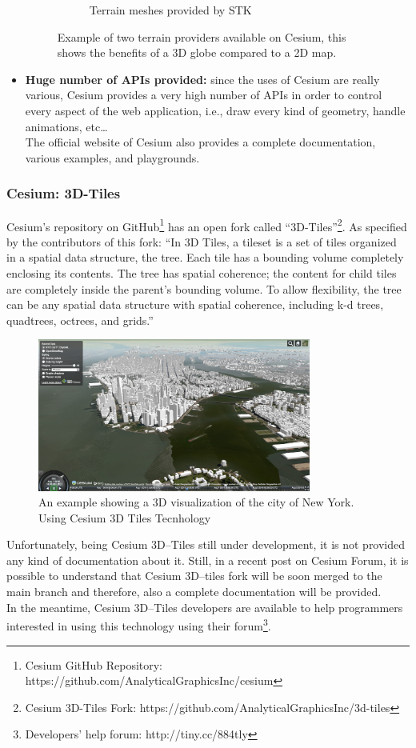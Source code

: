 \begin{itemize}
\begin{figure} [H]
\begin{subfigure}[b]{0.3\textwidth}
			\caption{Terrain meshes provided by STK}
			\label{fig:3D-Map}
		\end{subfigure}
		\caption{Example of two terrain providers available on Cesium, this shows the benefits of a 3D globe compared to a 2D map.}
	\end{figure}
	\item {\bf Huge number of APIs provided:} since the uses of Cesium are really various, Cesium provides a very high number of APIs in order to control every aspect of the web application, i.e., draw every kind of geometry, handle animations, etc\dots\\The official website of Cesium also provides a complete documentation, various examples, and playgrounds.
\end{itemize} 
\subsubsection{Cesium: 3D-Tiles}
Cesium's repository on GitHub\footnote{Cesium GitHub Repository: https://github.com/AnalyticalGraphicsInc/cesium} has an open fork called ``3D-Tiles''\footnote{Cesium 3D-Tiles Fork: https://github.com/AnalyticalGraphicsInc/3d-tiles}. As specified by the contributors of this fork:  ``In 3D Tiles, a tileset is a set of tiles organized in a spatial data structure, the tree. Each tile has a bounding volume completely enclosing its contents. The tree has spatial coherence; the content for child tiles are completely inside the parent's bounding volume. To allow flexibility, the tree can be any spatial data structure with spatial coherence, including k-d trees, quadtrees, octrees, and grids.''
\begin{figure} [H]
\centering
\includegraphics[width=0.8\textwidth]{chapter2/images/NewYorkCityCesium3dTiles}
\caption{An example showing a 3D visualization of the city of New York. Using Cesium 3D Tiles Tecnhology}
\label{fig:NewYorkCityCesium3dTiles}
\end{figure}
Unfortunately, being Cesium 3D--Tiles still under development, it is not provided any kind of documentation about it. Still, in a recent post on Cesium Forum, it is possible to understand that Cesium 3D--tiles fork will be soon merged to the main branch and therefore, also a complete documentation will be provided. \\In the meantime, Cesium 3D--Tiles developers are available to help programmers interested in using this technology using their forum\footnote{Developers' help forum: http://tiny.cc/884tly}.

